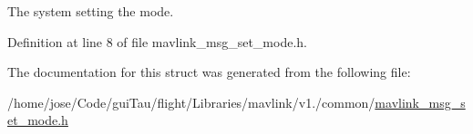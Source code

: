 The system setting the mode. 



Definition at line 8 of file mavlink\-\_\-msg\-\_\-set\-\_\-mode.\-h.



The documentation for this struct was generated from the following file\-:\begin{DoxyCompactItemize}
\item 
/home/jose/\-Code/gui\-Tau/flight/\-Libraries/mavlink/v1./common/\hyperlink{mavlink__msg__set__mode_8h}{mavlink\-\_\-msg\-\_\-set\-\_\-mode.\-h}\end{DoxyCompactItemize}
